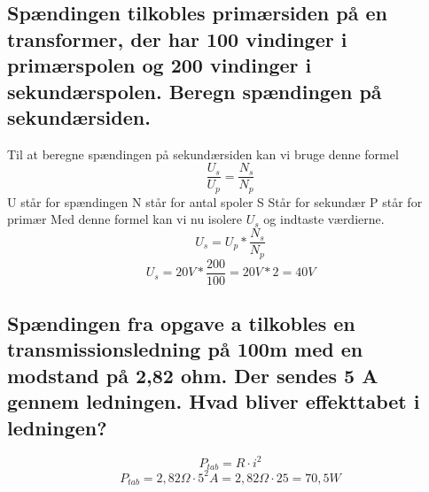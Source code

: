\subsection{Spændingen tilkobles primærsiden på en transformer, der har 100 vindinger i primærspolen og 200 vindinger i sekundærspolen. Beregn spændingen på sekundærsiden.}
Til at beregne spændingen på sekundærsiden kan vi bruge denne formel
\begin{equation*}
    \frac{U_{s}}{U_{p}}=\frac{N_{s}}{N_{p}}
\end{equation*}
U står for spændingen\newline
N står for antal spoler\newline
S Står for sekundær\newline
P står for primær\newline
Med denne formel kan vi nu isolere \begin{math}U_{s}\end{math} og indtaste værdierne.
\begin{equation*}
    U_{s}=U_{p}*\frac{N_{s}}{N_{p}}
\end{equation*}
\begin{equation*}
    U_{s}=20V*\frac{200}{100}=20V*2=40V
\end{equation*}

\subsection{Spændingen fra opgave a tilkobles en transmissionsledning på 100m med en modstand på 2,82 ohm. Der sendes 5 A gennem ledningen. Hvad bliver effekttabet i ledningen?}
\begin{equation*}
    P_{tab}=R\cdot i^{2}
\end{equation*}
\begin{equation*}
    P_{tab}=2,82\Omega\cdot 5^{2} A=2,82\Omega\cdot 25=70,5W
\end{equation*}

\newpage